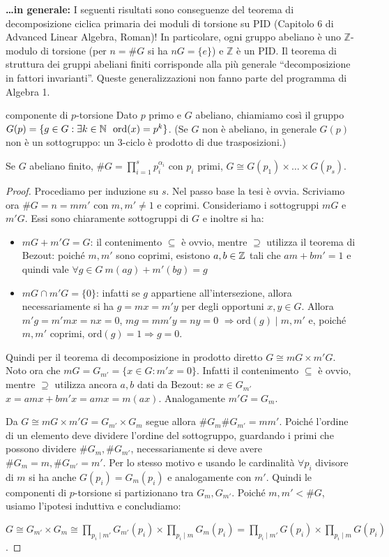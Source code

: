 \textbf{\ldots in generale:} I seguenti risultati sono conseguenze del teorema di decomposizione ciclica primaria dei moduli di torsione su PID (Capitolo 6 di Advanced Linear Algebra, Roman)! In particolare, ogni gruppo abeliano è uno $\mathbb{Z}$-modulo di torsione (per $n = \#G$ si ha $n G = \{e\}$) e $\mathbb{Z}$ è un PID. Il teorema di struttura dei gruppi abeliani finiti corrisponde alla più generale ``decomposizione in fattori invarianti''. Queste generalizzazioni non fanno parte del programma di Algebra 1.

\begin{definition}{componente di $p$-torsione}
    Dato $p$ primo e $G$ abeliano, chiamiamo così il gruppo $G(p) = \{g \in G : \exists k \in \mathbb{N}\ \ \text{ord}(x) = p^k\}$. (Se $G$ non è abeliano, in generale $G(p)$ non è un sottogruppo: un $3$-ciclo è prodotto di due trasposizioni.)
\end{definition}
\begin{theorem}{1}
    Se $G$ abeliano finito, $\#G = \prod_{i = 1}^s p_i^{\alpha_i}$ con $p_i$ primi,  $G \cong G(p_1) \times \dots \times G(p_s)$.
\end{theorem}
\begin{proof}
    Procediamo per induzione su $s$. Nel passo base la tesi è ovvia. Scriviamo ora $\#G = n = mm'$ con $m,m' \neq 1$ e coprimi. Consideriamo i sottogruppi $mG$ e $m'G$. Essi sono chiaramente sottogruppi di $G$ e inoltre si ha:
    \begin{itemize}
        \item $mG + m'G = G$: il contenimento $\subseteq$ è ovvio, mentre $\supseteq$ utilizza il teorema di Bezout: poiché $m,m'$ sono coprimi, esistono $a,b\in \mathbb{Z}$ tali che $am +bm' = 1$ e quindi vale $\forall g \in G \ m(ag) + m'(bg) = g$
        \item $mG \cap m'G = \{0\}$: infatti se $g$ appartiene all'intersezione, allora necessariamente si ha $g = mx = m'y$ per degli opportuni $x,y \in G$. Allora $m'g = m'mx = nx = 0$, $mg = mm'y = ny = 0$ $\Rightarrow \text{ord}(g) \mid m,m'$ e, poiché $m,m'$ coprimi, $\text{ord}(g) = 1 \Rightarrow g = 0$.
    \end{itemize}
    Quindi per il teorema di decomposizione in prodotto diretto $G \cong mG \times m'G$. Noto ora che $mG = G_{m'} = \{x \in G : m'x = 0\}$. Infatti il contenimento $\subseteq$ è ovvio, mentre $\supseteq$ utilizza ancora $a,b$ dati da Bezout: se $x \in G_{m'}$ $x = amx + bm'x = amx = m(ax)$. Analogamente $m'G = G_m$.
    
    Da $G \cong mG \times m'G = G_{m'} \times G_m$ segue allora $\#G_m \#G_{m'} = mm'$. Poiché l'ordine di un elemento deve dividere l'ordine del sottogruppo, guardando i primi che possono dividere $\#G_m, \#G_{m'}$, necessariamente si deve avere $\#G_m=m, \#G_{m'}=m'$. Per lo stesso motivo e usando le cardinalità $\forall p_i$ divisore di $m$ si ha anche $G(p_i) = G_m(p_i)$ e analogamente con $m'$. Quindi le componenti di $p$-torsione si partizionano tra $G_m, G_{m'}$. Poiché $m,m' < \#G$, usiamo l'ipotesi induttiva e concludiamo:
    
    $G \cong G_{m'}\times G_m \cong \prod_{p_i \mid m'} G_{m'}(p_i) \times \prod_{p_i \mid m} G_{m}(p_i) = \prod_{p_i \mid m'} G(p_i) \times \prod_{p_i \mid m} G(p_i)$.
\end{proof}
